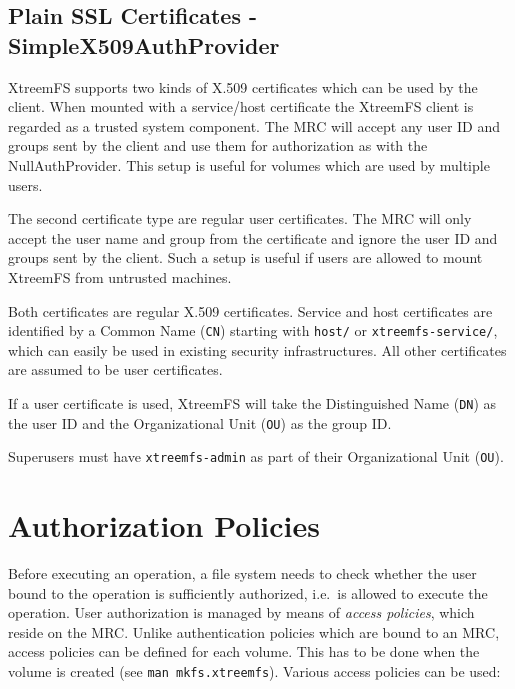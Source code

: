 \documentclass[a4paper,10pt]{book}
\begin{document}
\subsection{Plain SSL Certificates - SimpleX509AuthProvider}

XtreemFS supports two kinds of X.509 certificates which can be used by the client. When mounted with a service/host certificate the XtreemFS client is regarded as a trusted system component. The MRC will accept any user ID and groups sent by the client and use them for authorization as with the NullAuthProvider. This setup is useful for volumes which are used by multiple users.

The second certificate type are regular user certificates. The MRC will only accept the user name and group from the certificate and ignore the user ID and groups sent by the client. Such a setup is useful if users are allowed to mount XtreemFS from untrusted machines.

Both certificates are regular X.509 certificates. Service and host certificates are identified by a Common Name (\texttt{CN}) starting with \texttt{host/} or \texttt{xtreemfs-service/}, which can easily be used in existing security infrastructures. All other certificates are assumed to be user certificates.

If a user certificate is used, XtreemFS will take the Distinguished Name (\texttt{DN}) as the user ID and the Organizational Unit (\texttt{OU}) as the group ID.

Superusers must have \texttt{xtreemfs-admin} as part of their Organizational Unit (\texttt{OU}).


\section{Authorization Policies} \label{sec:access_policies}
Before executing an operation, a file system needs to check whether the user bound to the operation is sufficiently authorized, i.e.\ is allowed to execute the operation. User authorization is managed by means of \emph{access policies}, which reside on the MRC. Unlike authentication policies which are bound to an MRC, access policies can be defined for each volume. This has to be done when the volume is created (see \texttt{man mkfs.xtreemfs}). Various access policies can be used: 
\end{document}
